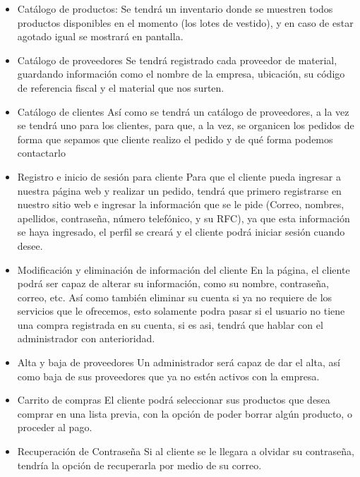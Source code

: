 \documentclass[12pt,a4paper]{article}
\begin{document}
\begin{multicols}{2}
\begin{itemize}
			\item Catálogo de productos:
			\subitem Se tendrá un inventario donde se
			muestren todos productos disponibles
			en el momento (los lotes de vestido), y
			en caso de estar agotado igual se
			mostrará en pantalla.
			
			\item Catálogo de proveedores
			\subitem Se tendrá registrado cada proveedor de
			material, guardando información como
			el nombre de la empresa, ubicación, su
			código de referencia fiscal y el material
			que nos surten.
			
			\item Catálogo de clientes
			\subitem Así como se tendrá un catálogo de
			proveedores, a la vez se tendrá uno
			para los clientes, para que, a la vez, se
			organicen los pedidos de forma que
			sepamos que cliente realizo el pedido y
			de qué forma podemos contactarlo
			
			\item Registro e inicio de sesión para cliente
			\subitem Para que el cliente pueda ingresar a
			nuestra página web y realizar un
			pedido, tendrá que primero registrarse
			en nuestro sitio web e ingresar la
			información que se le pide (Correo,
			nombres, apellidos, contraseña,
			número telefónico, y su RFC), ya que
			esta información se haya ingresado, el
			perfil se creará y el cliente podrá iniciar
			sesión cuando desee.
			
			\item Modificación y eliminación de
			información del cliente
			\subitem En la página, el cliente podrá ser capaz
			de alterar su información, como su
			nombre, contraseña, correo, etc. Así
			como también eliminar su cuenta si ya
			no requiere de los servicios que le
			ofrecemos, esto solamente podra pasar
			si el usuario no tiene una compra
			registrada en su cuenta, si es asi,
			tendrá que hablar con el administrador
			con anterioridad.
			
			\item Alta y baja de proveedores
			\subitem Un administrador será capaz de dar el
			alta, así como baja de sus proveedores
			que ya no estén activos con la empresa.
			
			\item Carrito de compras
			\subitem El cliente podrá seleccionar sus
			productos que desea comprar en una
			lista previa, con la opción de poder
			borrar algún producto, o proceder al
			pago.
			
			\item Recuperación de Contraseña
			\subitem Si al cliente se le llegara a olvidar su
			contraseña, tendría la opción de
			recuperarla por medio de su correo.
			
			
		\end{itemize}
	\end{multicols} 
	
\end{document}
